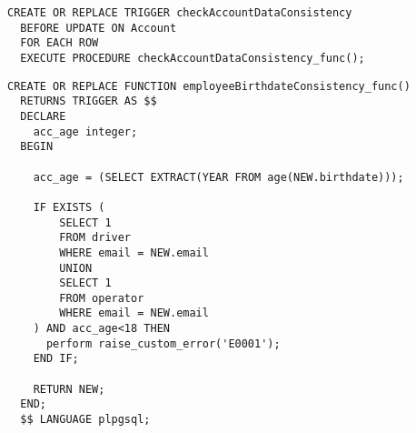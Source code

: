 \begin{lstlisting}[caption={Trigger per implementare \textbf{checkAccountDataConsistency}}]
  CREATE OR REPLACE TRIGGER checkAccountDataConsistency
  BEFORE UPDATE ON Account
  FOR EACH ROW
  EXECUTE PROCEDURE checkAccountDataConsistency_func();
\end{lstlisting}

\begin{lstlisting}[caption={Funzione \textbf{checkAccountDataConsistency}}]
  CREATE OR REPLACE FUNCTION employeeBirthdateConsistency_func()
  RETURNS TRIGGER AS $$
  DECLARE
    acc_age integer;
  BEGIN

    acc_age = (SELECT EXTRACT(YEAR FROM age(NEW.birthdate)));

    IF EXISTS (
        SELECT 1 
        FROM driver
        WHERE email = NEW.email
        UNION 
        SELECT 1
        FROM operator
        WHERE email = NEW.email
    ) AND acc_age<18 THEN
      perform raise_custom_error('E0001');
    END IF;

    RETURN NEW;
  END;
  $$ LANGUAGE plpgsql;
\end{lstlisting}
